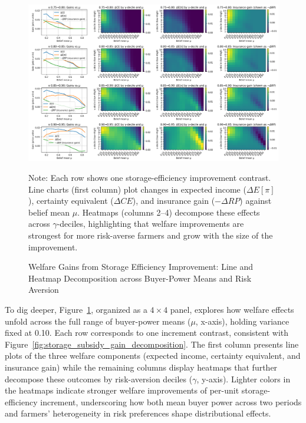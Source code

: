 \begin{figure}[ht]
    \centering
    \includegraphics[width=\linewidth]{model_figures/storage_subsidy_gain_heatmap.png}
    \caption{Welfare Gains from Storage Efficiency Improvement: Line and Heatmap Decomposition across Buyer-Power Means and Risk Aversion}
    \label{fig: storage_subsidy_gain_heatmap}
    \begin{tablenotes}[flushleft]
    \footnotesize
    \item Note: Each row shows one storage-efficiency improvement contrast. Line charts (first column) plot changes in expected income ($\Delta E[\pi]$), certainty equivalent ($\Delta CE$), and insurance gain ($-\Delta RP$) against belief mean $\mu$. Heatmaps (columns 2--4) decompose these effects across $\gamma$-deciles, highlighting that welfare improvements are strongest for more risk-averse farmers and grow with the size of the improvement.
    \end{tablenotes}
\end{figure}

To dig deeper, Figure~\ref{fig: storage_subsidy_gain_heatmap}, organized as a $4 \times 4$ panel, explores how welfare effects unfold across the full range of buyer-power means ($\mu$, x-axis), holding variance fixed at 0.10. Each row corresponds to one increment contrast, consistent with Figure~\ref{fig:storage_subsidy_gain_decomposition}. The first column presents line plots of the three welfare components (expected income, certainty equivalent, and insurance gain) while the remaining columns display heatmaps that further decompose these outcomes by risk-aversion deciles ($\gamma$, y-axis). Lighter colors in the heatmaps indicate stronger welfare improvements of per-unit storage-efficiency increment, underscoring how both mean buyer power across two periods and farmers' heterogeneity in risk preferences shape distributional effects.

